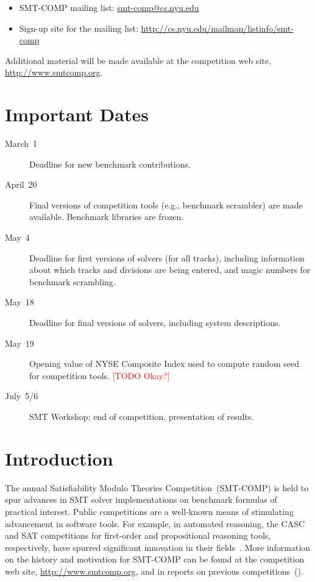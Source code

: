 \documentclass[12pt]{article}
\newcommand{\rem}[1]{\textcolor{red}{[#1]}}
\newcommand{\todo}[1]{\rem{TODO #1}}
\begin{document}
\begin{itemize}
\item SMT-COMP mailing list:
  \href{mailto:smt-comp@cs.nyu.edu}{\textrm{smt-comp@cs.nyu.edu}}
\item Sign-up site for the mailing list:
  \url{http://cs.nyu.edu/mailman/listinfo/smt-comp}
\end{itemize}

\noindent Additional material will be made available at the
competition web site, \url{http://www.smtcomp.org}.


\newpage

\section{Important Dates}
\label{sec:important}

\begin{description}
\item[March~1] Deadline for new benchmark contributions.
\item[April~20] Final versions of competition tools (e.g., benchmark
  scrambler) are made available.  Benchmark libraries are frozen.
\item[May~4] Deadline for first versions of solvers (for all tracks),
  including information about which tracks and divisions are being
  entered, and magic numbers for benchmark scrambling.
\item[May~18] Deadline for final versions of solvers, including
  system descriptions.
\item[May~19] Opening value of NYSE Composite Index used to compute
  random seed for competition tools. \todo{Okay?}
\item[July~5/6] SMT Workshop; end of competition, presentation of
  results.
\end{description}


\section{Introduction}

The annual Satisfiability Modulo Theories Competition~(SMT-COMP) is
held to spur advances in SMT solver implementations on benchmark
formulas of practical interest.  Public competitions are a well-known
means of stimulating advancement in software tools.  For example, in
automated reasoning, the CASC and SAT competitions for first-order and
propositional reasoning tools, respectively, have spurred significant
innovation in their fields~\cite{leberre+03,PSS02}.  More information
on the history and motivation for SMT-COMP can be found at the
competition web site, \url{http://www.smtcomp.org}, and in reports on
previous
competitions~(\cite{SMTCOMP-JAR,SMTCOMP-FMSD,BDOS08,SMTCOMP-2008,CDW14,SMTCOMP-2012,CSW15}).
\end{document}
